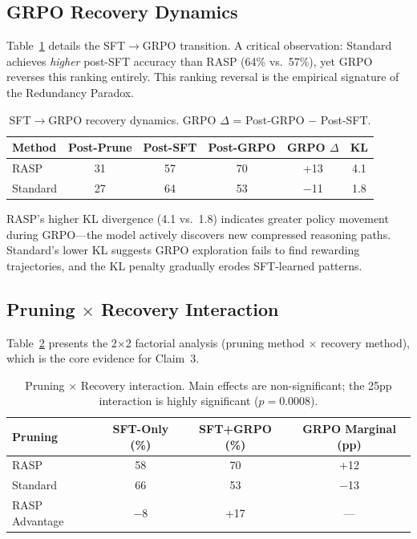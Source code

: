 \documentclass[11pt,a4paper]{article}
\newcommand{\method}{RASP}
\begin{document}
\subsection{GRPO Recovery Dynamics}
\label{sec:grpo}

Table~\ref{tab:grpo} details the SFT$\to$GRPO transition. A critical observation: Standard achieves \emph{higher} post-SFT accuracy than \method{} (64\% vs.\ 57\%), yet GRPO reverses this ranking entirely. This ranking reversal is the empirical signature of the Redundancy Paradox.

\begin{table}[t]
\centering
\small
\caption{SFT$\to$GRPO recovery dynamics. GRPO $\Delta$ = Post-GRPO $-$ Post-SFT.}
\label{tab:grpo}
\begin{tabular}{lccccc}
\toprule
\textbf{Method} & \textbf{Post-Prune} & \textbf{Post-SFT} & \textbf{Post-GRPO} & \textbf{GRPO $\Delta$} & \textbf{KL} \\
\midrule
\method{} & 31 & 57 & 70 & +13 & 4.1 \\
Standard & 27 & 64 & 53 & $-$11 & 1.8 \\
\bottomrule
\end{tabular}
\end{table}

\method{}'s higher KL divergence (4.1 vs.\ 1.8) indicates greater policy movement during GRPO---the model actively discovers new compressed reasoning paths. Standard's lower KL suggests GRPO exploration fails to find rewarding trajectories, and the KL penalty gradually erodes SFT-learned patterns.

\subsection{Pruning $\times$ Recovery Interaction}
\label{sec:interaction}

Table~\ref{tab:interaction} presents the 2$\times$2 factorial analysis (pruning method $\times$ recovery method), which is the core evidence for Claim~3.

\begin{table}[t]
\centering
\small
\caption{Pruning $\times$ Recovery interaction. Main effects are non-significant; the 25pp interaction is highly significant ($p = 0.0008$).}
\label{tab:interaction}
\begin{tabular}{lccc}
\toprule
\textbf{Pruning} & \textbf{SFT-Only (\%)} & \textbf{SFT+GRPO (\%)} & \textbf{GRPO Marginal (pp)} \\
\midrule
\method{} & 58 & 70 & +12 \\
Standard & 66 & 53 & $-$13 \\
\midrule
\method{} Advantage & $-$8 & +17 & --- \\
\bottomrule
\end{tabular}
\end{table}
\end{document}
